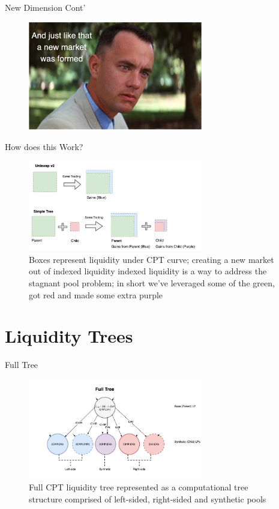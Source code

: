 \documentclass[10pt,xcolor=svgnames]{beamer} %
\begin{document}
\begin{frame}{New Dimension Cont'} 

\begin{figure}[h!]
\includegraphics[width=3in]{img/gump.png}
\label{fig:gump}
\end{figure}

\end{frame}

\begin{frame}{How does this Work?} 

\begin{figure}[h!]
\includegraphics[width=3in]{img/compare.png}
\caption{Boxes represent liquidity under CPT curve; creating a new market out of indexed liquidity indexed liquidity is a way to address the stagnant pool problem; in short we've leveraged some of the green, got red and made some extra purple} 
\label{fig:compare}
\end{figure}

\end{frame}



\section{Liquidity Trees}

\begin{frame}{Full Tree} 

\begin{figure}[h!]
\includegraphics[width=3in]{img/full_tree.png}
\caption{Full CPT liquidity tree represented as a computational tree structure comprised of left-sided, right-sided and synthetic pools } 
\label{fig:full_tree}
\end{figure}

\end{frame}
\end{document}
